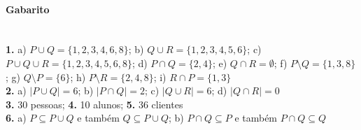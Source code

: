 \documentclass[a4paper,twocolumn,12pt]{article}
\begin{document}
\vfill

{\footnotesize
\paragraph*{Gabarito} \hspace*{\fill}\\
\textbf{1.} a) \(P\cup Q = \{1,2,3,4,6,8\}\); b) \(Q\cup R = \{1,2,3,4,5,6\}\); c) \(P\cup Q \cup R = \{1,2,3,4,5,6,8\}\); d) \(P\cap Q = \{2,4\}\); e) \(Q\cap R = \emptyset\); f) \(P\setminus Q = \{1,3,8\}\); g) \(Q\setminus P = \{6\}\); h) \(P\setminus R = \{2,4,8\}\); i) \(R\cap P = \{1,3\}\)\\
\textbf{2.} a) \(|P\cup Q| = 6\); b) \(|P\cap Q| = 2\); c) \(|Q\cup R| = 6\); d) \(|Q\cap R| = 0\)\\
\textbf{3.} 30 pessoas; \textbf{4.} 10 alunos; \textbf{5.} 36 clientes\\
\textbf{6.} a) \(P\subseteq P\cup Q\) e também $Q\subseteq P\cup Q$; b) \(P\cap Q\subseteq P\) e também \(P\cap Q\subseteq Q\)
}
\end{document}
